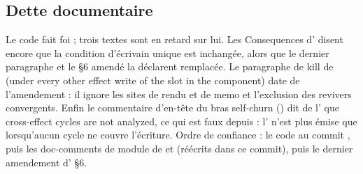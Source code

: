 \subsection{Dette documentaire}

Le code fait foi ; trois textes sont en retard sur lui. Les \og Consequences\fg{} d'
disent encore que la condition d'écrivain unique est inchangée, alors que le dernier
paragraphe et le \S6 amendé la déclarent remplacée. Le paragraphe de kill de
 (\og under every other effect write of the slot in the
component\fg) date de l'amendement  : il ignore les sites de rendu et de memo et
l'exclusion des revivers convergents. Enfin le commentaire d'en-tête du bras self-churn
() dit de l'\Info{} que \og cross-effect
cycles are not analyzed\fg, ce qui est faux depuis  : l'\Info{} n'est plus émise que
lorsqu'aucun cycle ne couvre l'écriture. Ordre de confiance : le code au commit
\snapshotCommit, puis les doc-comments de module de  et 
(réécrits dans ce commit), puis le dernier amendement d' \S6.

